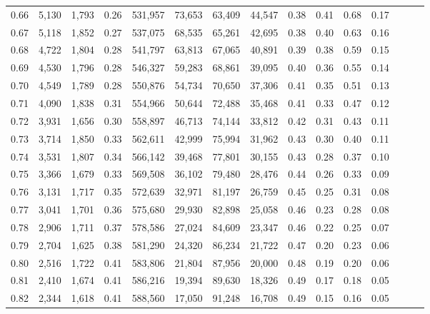 \begin{tabular}{rrrrrrrrrrrrrrr}
0.66 &   5,130 &  1,793 &  0.26 &  531,957 &   73,653 &   63,409 &   44,547 &  0.38 &  0.41 &  0.68 &      0.17 \\
0.67 &   5,118 &  1,852 &  0.27 &  537,075 &   68,535 &   65,261 &   42,695 &  0.38 &  0.40 &  0.63 &      0.16 \\
0.68 &   4,722 &  1,804 &  0.28 &  541,797 &   63,813 &   67,065 &   40,891 &  0.39 &  0.38 &  0.59 &      0.15 \\
0.69 &   4,530 &  1,796 &  0.28 &  546,327 &   59,283 &   68,861 &   39,095 &  0.40 &  0.36 &  0.55 &      0.14 \\
0.70 &   4,549 &  1,789 &  0.28 &  550,876 &   54,734 &   70,650 &   37,306 &  0.41 &  0.35 &  0.51 &      0.13 \\
0.71 &   4,090 &  1,838 &  0.31 &  554,966 &   50,644 &   72,488 &   35,468 &  0.41 &  0.33 &  0.47 &      0.12 \\
0.72 &   3,931 &  1,656 &  0.30 &  558,897 &   46,713 &   74,144 &   33,812 &  0.42 &  0.31 &  0.43 &      0.11 \\
0.73 &   3,714 &  1,850 &  0.33 &  562,611 &   42,999 &   75,994 &   31,962 &  0.43 &  0.30 &  0.40 &      0.11 \\
0.74 &   3,531 &  1,807 &  0.34 &  566,142 &   39,468 &   77,801 &   30,155 &  0.43 &  0.28 &  0.37 &      0.10 \\
0.75 &   3,366 &  1,679 &  0.33 &  569,508 &   36,102 &   79,480 &   28,476 &  0.44 &  0.26 &  0.33 &      0.09 \\
0.76 &   3,131 &  1,717 &  0.35 &  572,639 &   32,971 &   81,197 &   26,759 &  0.45 &  0.25 &  0.31 &      0.08 \\
0.77 &   3,041 &  1,701 &  0.36 &  575,680 &   29,930 &   82,898 &   25,058 &  0.46 &  0.23 &  0.28 &      0.08 \\
0.78 &   2,906 &  1,711 &  0.37 &  578,586 &   27,024 &   84,609 &   23,347 &  0.46 &  0.22 &  0.25 &      0.07 \\
0.79 &   2,704 &  1,625 &  0.38 &  581,290 &   24,320 &   86,234 &   21,722 &  0.47 &  0.20 &  0.23 &      0.06 \\
0.80 &   2,516 &  1,722 &  0.41 &  583,806 &   21,804 &   87,956 &   20,000 &  0.48 &  0.19 &  0.20 &      0.06 \\
0.81 &   2,410 &  1,674 &  0.41 &  586,216 &   19,394 &   89,630 &   18,326 &  0.49 &  0.17 &  0.18 &      0.05 \\
0.82 &   2,344 &  1,618 &  0.41 &  588,560 &   17,050 &   91,248 &   16,708 &  0.49 &  0.15 &  0.16 &      0.05 \\

\end{tabular}
